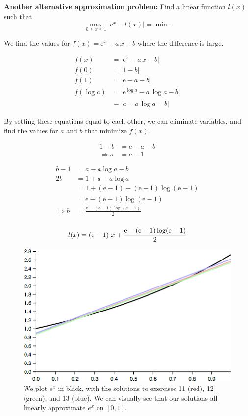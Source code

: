 \textbf{Another alternative approximation problem:} Find a linear function $l(x)$ such that \[\max_{0\le x\le 1} |\mathrm{e}^x - l(x)| = \min.\]

{\color{blue}

We find the values for $f(x) = \mathrm{e}^x - a\, x - b$ where the
difference is large.

\[
\begin{aligned}
f(x) &= |\mathrm{e}^x - a\, x - b| \\
f(0) &= | 1 - b | \\
f(1) &= | \mathrm{e} - a - b| \\
f(\log a) &= | \mathrm{e}^{\log a} - a\, \log a - b| \\
&= | a - a\, \log a - b |
\end{aligned}
\]

By setting these equations equal to each other, we can eliminate
variables, and find the values for $a$ and $b$ that minimize $f(x)$.

\[
\begin{aligned}
1 - b &= \mathrm{e} - a - b \\
\Rightarrow a &= \mathrm{e} - 1
\end{aligned}
\]

\[
\begin{aligned}
b - 1 &= a - a \log a - b \\
2b &= 1 + a - a \log a \\
&= 1 + (\mathrm{e} - 1) - (\mathrm{e} -1) \log (\mathrm{e} - 1) \\
&= \mathrm{e} - (\mathrm{e} -1) \log (\mathrm{e} - 1) \\
\Rightarrow b &=
\frac{\mathrm{e} - (\mathrm{e} -1) \log (\mathrm{e} - 1)}{2} \\
\end{aligned}
\]

\[
l(x) =
\left(\mathrm{e} - 1\right)\, x +
\frac{\mathrm{e} - (\mathrm{e} -1) \log (\mathrm{e} - 1)}{2} \\
\]

\begin{figure}[H]
\centering
\includegraphics[scale=0.65]{approximations-of-e-x.png}
\caption{We plot $e^x$ in black, with the solutions to exercises 11 (red),
12 (green), and 13 (blue). We can visually see that our solutions all
linearly approximate $e^x$ on $[0,1]$.}
\end{figure}

}
